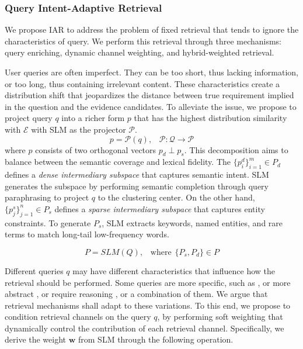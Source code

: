 \subsubsection{Query Intent-Adaptive Retrieval}
We propose IAR to address the problem of fixed retrieval that tends to ignore the characteristics of query.
We perform this retrieval through three mechanisms: query enriching, dynamic channel weighting, and hybrid-weighted retrieval.

User queries are often imperfect.
They can be too short, thus lacking information, or too long, thus containing irrelevant content.
These characteristics create a distribution shift that jeopardizes the distance between true requirement implied in the question and the evidence candidates.
To alleviate the issue, we propose to project query $q$ into a richer form $p$ that has the highest distribution similarity with $\mathcal{E}$ with SLM as the projector $\mathcal{P}$.
\begin{equation}
p = \mathcal{P}(q), \hspace{10pt} \mathcal{P}:\mathcal{Q} \xrightarrow{}\mathcal{P}
\end{equation}
where $p$ consists of two orthogonal vectors $p_d\perp p_s$.
This decomposition aims to balance between the semantic coverage and lexical fidelity.
The $\{p^{d}_i\}_{i=1}^m \in P_d$ defines a \textit{dense intermediary subspace} that captures semantic intent.
SLM generates the subspace by performing semantic completion through query paraphrasing to project $q$ to the clustering center.
On the other hand, $\{p^{s}_j\}_{j=1}^n \in P_s$ defines a \textit{sparse intermediary subspace} that captures entity constraints.
To generate $P_s$, SLM extracts keywords, named entities, and rare terms to match long-tail low-frequency words.


\begin{equation}
P = SLM(Q), \hspace{10pt} \text{where} \hspace{5pt} \{P_s,P_d\} \in P
\end{equation}

Different queries $q$ may have different characteristics that influence how the retrieval should be performed.
Some queries are more specific, such as , or more abstract , or require reasoning , or a combination of them.
We argue that retrieval mechanisms shall adapt to these variations. 
To this end, we propose to condition retrieval channels on the query $q$, by performing soft weighting that dynamically control the contribution of each retrieval channel.
Specifically, we derive the weight $\textbf{w}$ from SLM through the following operation.

